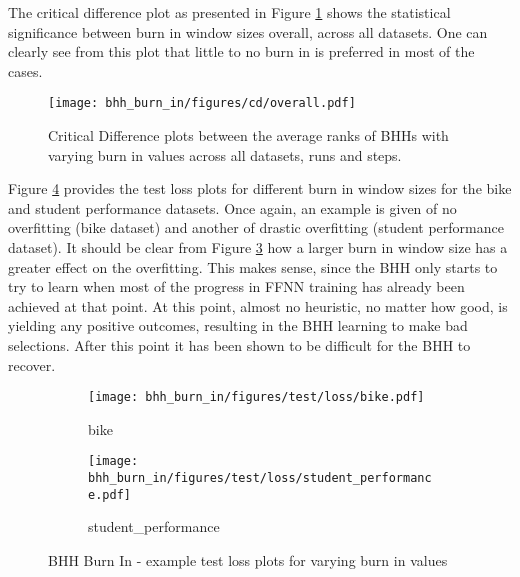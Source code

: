 The critical difference plot as presented in Figure \ref{fig:results:burn_in:descriptive:cd} shows the statistical significance between burn in window sizes overall, across all datasets. One can clearly see from this plot that little to no burn in is preferred in most of the cases.


\begin{figure}[htbp]
      \centering
      \texttt{[image: bhh\_burn\_in/figures/cd/overall.pdf]}
      \caption{Critical Difference plots between the average ranks of \Acsp{BHH} with varying burn in values across all datasets, runs and steps.}
      \label{fig:results:burn_in:descriptive:cd}
\end{figure}

Figure \ref{fig:results:burn_in:figures:loss} provides the test loss plots for different burn in window sizes for the bike and student performance datasets. Once again, an example is given of no overfitting (bike dataset) and another of drastic overfitting (student performance dataset). It should be clear from Figure \ref{fig:results:burn_in:figures:loss2} how a larger burn in window size has a greater effect on the overfitting. This makes sense, since the \Ac{BHH} only starts to try to learn when most of the progress in \ac{FFNN} training has already been achieved at that point. At this point, almost no heuristic, no matter how good, is yielding any positive outcomes, resulting in the \Ac{BHH} learning to make bad selections. After this point it has been shown to be difficult for the \Ac{BHH} to recover.



\begin{figure}[htbp]
      \begin{subfigure}{0.5\textwidth}
            \centering
            \texttt{[image: bhh\_burn\_in/figures/test/loss/bike.pdf]}
            \caption{bike}
            \label{fig:results:burn_in:figures:loss1}
      \end{subfigure}
      \begin{subfigure}{0.5\textwidth}
            \centering
            \texttt{[image: bhh\_burn\_in/figures/test/loss/student\_performance.pdf]}
            \caption{student\_performance}
            \label{fig:results:burn_in:figures:loss2}
      \end{subfigure}
      \caption{\Acs{BHH} Burn In - example test loss plots for varying burn in values}
      \label{fig:results:burn_in:figures:loss}
\end{figure}

